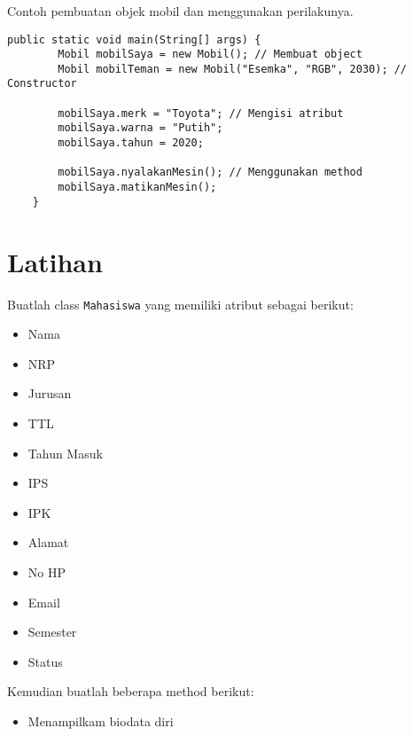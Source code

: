 \documentclass{../praktikum-ppt}
\begin{document}
  \begin{frame}[fragile]
    \frametitle{\insertsection}
    \begin{contoh}
      Contoh pembuatan objek mobil dan menggunakan perilakunya.
    \end{contoh}
    \begin{lstlisting}[caption={Contoh Penggunaan Object Mobil}]
    public static void main(String[] args) {
        Mobil mobilSaya = new Mobil(); // Membuat object
        Mobil mobilTeman = new Mobil("Esemka", "RGB", 2030); // Constructor
        
        mobilSaya.merk = "Toyota"; // Mengisi atribut
        mobilSaya.warna = "Putih";
        mobilSaya.tahun = 2020;

        mobilSaya.nyalakanMesin(); // Menggunakan method
        mobilSaya.matikanMesin();
    }
    \end{lstlisting}
  \end{frame}

  \section{Latihan}
  \begin{frame}
    \begin{latihan}
      Buatlah class \texttt{Mahasiswa} yang memiliki atribut sebagai berikut:
      \begin{multicols}{5}
        \begin{itemize}
          \item Nama
          \item NRP
          \item Jurusan
          \item TTL
          \item Tahun Masuk
          \item IPS
          \item IPK
          \item Alamat
          \item No HP
          \item Email
          \item Semester
          \item Status
        \end{itemize}
      \end{multicols}
      Kemudian buatlah beberapa method berikut:
        \begin{itemize}
          \item Menampilkam biodata diri
        \end{itemize}
    \end{latihan}
  \end{frame}
\end{document}
